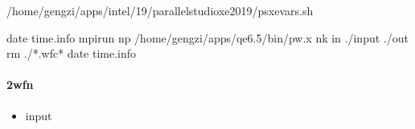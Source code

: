 \documentclass[a4paper,12pt,english]{sphinxmanual}
\begin{document}
\begin{sphinxVerbatim}[commandchars=\\\{\}]


 
 /home/gengzi/apps/intel/19/parallel\PYGZus{}studio\PYGZus{}xe\PYGZus{}2019/psxevars.sh

date  \PYGZgt{}\PYGZgt{} time.info
mpirun \PYGZhy{}np  /home/gengzi/apps/qe\PYGZhy{}6.5/bin/pw.x \PYGZhy{}nk   \PYGZhy{}in ./input \PYGZgt{} ./out
rm ./*.wfc*
date  \PYGZgt{}\PYGZgt{} time.info
\end{sphinxVerbatim}


\paragraph{2\sphinxhyphen{}wfn}
\label{\detokenize{tutorials/berkeleygw/gw:wfn}}\begin{itemize}
\item {} 
\sphinxAtStartPar
input

\end{itemize}
\end{document}
